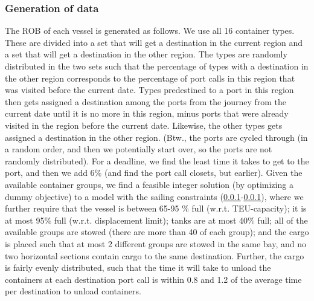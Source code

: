 

\subsubsection{Generation of data} 
The ROB of each vessel is generated as follows. We use all 16 container types. These are divided into a set that will get a destination in the current region and a set that will get a destination in the other region. The types are randomly distributed in the two sets such that the percentage of types with a destination in the other region corresponds to the percentage of port calls in this region that was visited before the current date. Types predestined to a port in this region then gets assigned a destination among the ports from the journey from the current date until it is no more in this region, minus ports that were already visited in the region before the current date. Likewise, the other types gets assigned a destination in the other region. (Btw., the ports are cycled through (in a random order, and then we potentially start over, so the ports are not randomly distributed). For a deadline, we find the least time it takes to get to the port, and then we add 6\% (and find the port call closets, but earlier).
Given the available container groups, we find a feasible integer solution (by optimizing a dummy objective) to a model with the sailing constraints (\ref{}-\ref{}), where we further require that the vessel is between 65-95 \% full (w.r.t. TEU-capacity); it is at most 95\% full (w.r.t. displacement limit); tanks are at most 40\% full; all of the available groups are stowed (there are more than 40 of each group); and the cargo is placed such that at most 2 different groups are stowed in the same bay, and no two horizontal sections contain cargo to the same destination. Further, the cargo is fairly evenly distributed, such that the time it will take to unload the containers at each destination port call is within 0.8 and 1.2 of the average time per destination to unload containers.

